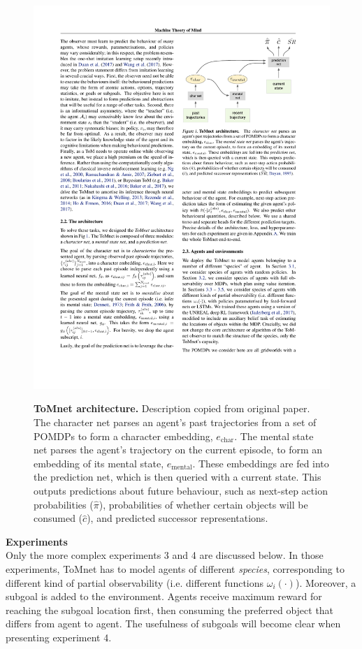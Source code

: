 \documentclass[twocolumn,superscriptaddress,aps]{revtex4-1}
\begin{document}
\begin{figure}[!htb]
\includegraphics[width=\linewidth, height=\textheight, keepaspectratio]{figs/model}
\label{fig:model}
\caption{\textbf{ToMnet architecture.} Description copied from original paper. The character net parses an agent’s past trajectories from a set of POMDPs to form a character
embedding, $e_{\text{char}}$. The mental state net parses the agent’s trajectory on the current episode, to form an embedding of its mental state, $e_{\text{mental}}$. These embeddings are fed into the prediction net, which is then queried with a current state. This outputs predictions about future behaviour, such as next-step action probabilities ($\hat{\pi}$), probabilities of whether certain objects will be consumed ($\hat{c}$), and predicted successor representations.}
\end{figure}

\noindent \textbf{Experiments} \\[0.15cm]
Only the more complex experiments 3 and 4 are discussed below. In those experiments, ToMnet has to model agents of different \textit{species}, corresponding to different kind of partial observability (i.e. different functions $\omega_i(\cdot)$). Moreover, a subgoal is added to the environment. Agents receive maximum reward for reaching the subgoal location first, then consuming the preferred object that differs from agent to agent. The usefulness of subgoals will become clear when presenting experiment 4.\\
\end{document}
